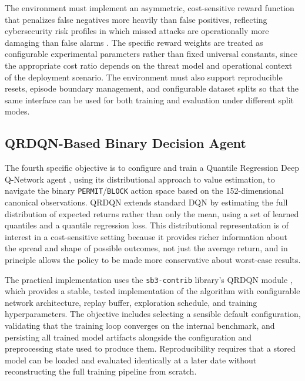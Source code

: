 The environment must implement an asymmetric, cost-sensitive reward function that penalizes false negatives more heavily than false positives, reflecting cybersecurity risk profiles in which missed attacks are operationally more damaging than false alarms \parencite{Lee2002CostSensitiveIDS,Cardenas2006IDSFramework}. The specific reward weights are treated as configurable experimental parameters rather than fixed universal constants, since the appropriate cost ratio depends on the threat model and operational context of the deployment scenario. The environment must also support reproducible resets, episode boundary management, and configurable dataset splits so that the same interface can be used for both training and evaluation under different split modes.

\subsection{QRDQN-Based Binary Decision Agent}
The fourth specific objective is to configure and train a Quantile Regression Deep Q-Network agent \parencite{Dabney2018QRDQN}, using its distributional approach to value estimation, to navigate the binary \texttt{PERMIT}/\texttt{BLOCK} action space based on the 152-dimensional canonical observations. QRDQN extends standard DQN by estimating the full distribution of expected returns rather than only the mean, using a set of learned quantiles and a quantile regression loss. This distributional representation is of interest in a cost-sensitive setting because it provides richer information about the spread and shape of possible outcomes, not just the average return, and in principle allows the policy to be made more conservative about worst-case results.

The practical implementation uses the \texttt{sb3-contrib} library's QRDQN module \parencite{SB3ContribQRDQNDocs}, which provides a stable, tested implementation of the algorithm with configurable network architecture, replay buffer, exploration schedule, and training hyperparameters. The objective includes selecting a sensible default configuration, validating that the training loop converges on the internal benchmark, and persisting all trained model artifacts alongside the configuration and preprocessing state used to produce them. Reproducibility requires that a stored model can be loaded and evaluated identically at a later date without reconstructing the full training pipeline from scratch.

